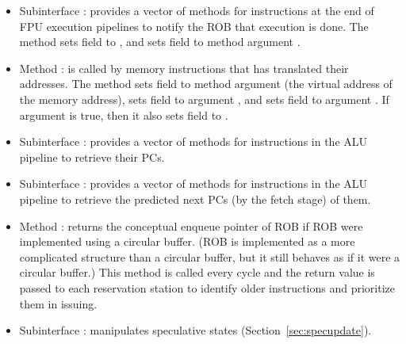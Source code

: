 \begin{itemize}
    \item Subinterface : provides a vector of methods for instructions at the end of FPU execution pipelines to notify the ROB that execution is done.
    The method sets field  to , and sets field  to method argument .
    
    \item Method : is called by memory instructions that has translated their addresses.
    The method sets field  to method argument  (the virtual address of the memory address), sets field  to argument , and sets field  to argument .
    If argument  is true, then it also sets field  to .
    
    \item Subinterface : provides a vector of methods for instructions in the ALU pipeline to retrieve their PCs.
    
    \item Subinterface : provides a vector of methods for instructions in the ALU pipeline to retrieve the predicted next PCs (by the fetch stage) of them.
    
    \item Method : returns the conceptual enqueue pointer of ROB if ROB were implemented using a circular buffer.
    (ROB is implemented as a more complicated structure than a circular buffer, but it still behaves as if it were a circular buffer.)
    This method is called every cycle and the return value is passed to each reservation station to identify older instructions and prioritize them in issuing.
    
    \item Subinterface : manipulates speculative states (Section~\ref{sec:specupdate}).
\end{itemize}

